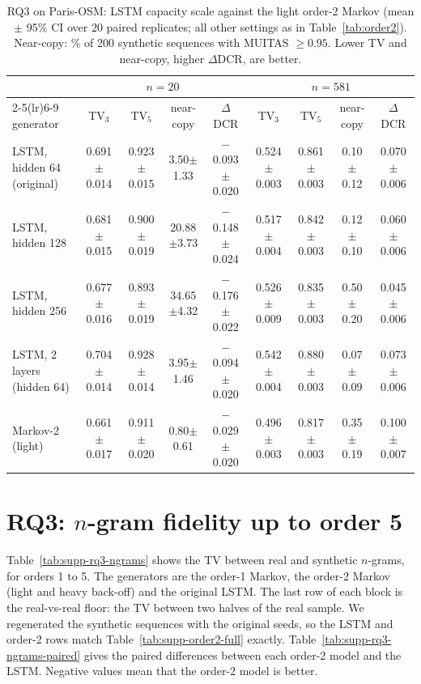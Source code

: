 \begin{table}[!t]
\caption{RQ3 on Paris-OSM: LSTM capacity scale against the light order-2 Markov (mean $\pm$ 95\% CI over 20 paired replicates; all other settings as in Table~\ref{tab:order2}). Near-copy: \% of 200 synthetic sequences with MUITAS $\ge 0.95$. Lower TV and near-copy, higher $\Delta$DCR, are better.}
\label{tab:capacity}
\centering\scriptsize
\begin{tabular}{l cccc cccc}
\toprule
 & \multicolumn{4}{c}{$n{=}20$} & \multicolumn{4}{c}{$n{=}581$} \\
\cmidrule(lr){2-5}\cmidrule(lr){6-9}
generator & TV$_3$ & TV$_5$ & near-copy & $\Delta$DCR & TV$_3$ & TV$_5$ & near-copy & $\Delta$DCR \\
\midrule
LSTM, hidden 64 (original) & 0.691$\pm$0.014 & 0.923$\pm$0.015 & 3.50$\pm$1.33 & $-$0.093$\pm$0.020 & 0.524$\pm$0.003 & 0.861$\pm$0.003 & 0.10$\pm$0.12 & 0.070$\pm$0.006 \\
LSTM, hidden 128 & 0.681$\pm$0.015 & 0.900$\pm$0.019 & 20.88$\pm$3.73 & $-$0.148$\pm$0.024 & 0.517$\pm$0.004 & 0.842$\pm$0.003 & 0.12$\pm$0.10 & 0.060$\pm$0.006 \\
LSTM, hidden 256 & 0.677$\pm$0.016 & 0.893$\pm$0.019 & 34.65$\pm$4.32 & $-$0.176$\pm$0.022 & 0.526$\pm$0.009 & 0.835$\pm$0.003 & 0.50$\pm$0.20 & 0.045$\pm$0.006 \\
LSTM, 2 layers (hidden 64) & 0.704$\pm$0.014 & 0.928$\pm$0.014 & 3.95$\pm$1.46 & $-$0.094$\pm$0.020 & 0.542$\pm$0.004 & 0.880$\pm$0.003 & 0.07$\pm$0.09 & 0.073$\pm$0.006 \\
Markov-2 (light) & 0.661$\pm$0.017 & 0.911$\pm$0.020 & 0.80$\pm$0.61 & $-$0.029$\pm$0.020 & 0.496$\pm$0.003 & 0.817$\pm$0.003 & 0.35$\pm$0.19 & 0.100$\pm$0.007 \\
\bottomrule
\end{tabular}
\end{table}

\section{RQ3: $n$-gram fidelity up to order 5}
\label{supp:rq3-ngrams}
Table~\ref{tab:supp-rq3-ngrams} shows the TV between real and synthetic $n$-grams, for orders 1 to 5. The generators are the order-1 Markov, the order-2 Markov (light and heavy back-off) and the original LSTM. The last row of each block is the real-vs-real floor: the TV between two halves of the real sample. We regenerated the synthetic sequences with the original seeds, so the LSTM and order-2 rows match Table~\ref{tab:supp-order2-full} exactly. Table~\ref{tab:supp-rq3-ngrams-paired} gives the paired differences between each order-2 model and the LSTM. Negative values mean that the order-2 model is better.


